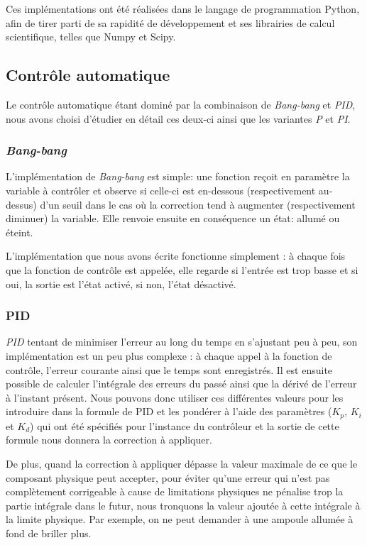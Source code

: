 \documentclass[a4paper,10pt]{report}
\begin{document}
Ces implémentations ont été réalisées dans le langage de programmation Python, afin de tirer parti de sa rapidité de développement et ses librairies de calcul scientifique, telles que Numpy et Scipy.

\subsection{Contrôle automatique}
\label{sec:contr-implem}
Le contrôle automatique étant dominé par la combinaison de \textit{Bang-bang} et \textit{PID}, nous avons choisi d'étudier en détail ces deux-ci ainsi que les variantes \textit{P} et \textit{PI}.

\subsubsection{\emph{Bang-bang}}

L'implémentation de \emph{Bang-bang} est simple: une fonction reçoit en paramètre la variable à contrôler et observe si celle-ci est en-dessous (respectivement au-dessus) d'un seuil dans le cas où la correction tend à augmenter (respectivement diminuer) la variable. Elle renvoie ensuite en conséquence un état: allumé ou éteint.

L'implémentation que nous avons écrite fonctionne simplement : à chaque fois que la fonction de contrôle est appelée, elle regarde si l'entrée est trop basse et si oui, la sortie est l'état activé, si non, l'état désactivé.

\subsubsection{PID}

\emph{PID} tentant de minimiser l'erreur au long du temps en s'ajustant peu à peu, son implémentation est un peu plus complexe : à chaque appel à la fonction de contrôle, l'erreur courante ainsi que le temps sont enregistrés.
Il est ensuite possible de calculer l'intégrale des erreurs du passé ainsi que la dérivé de l'erreur à l'instant présent.
Nous pouvons donc utiliser ces différentes valeurs pour les introduire dans la formule de PID et les pondérer à l'aide des paramètres ($K_p$, $K_i$ et $K_d$) qui ont été spécifiés pour l'instance du contrôleur et la sortie de cette formule nous donnera la correction à appliquer.

De plus, quand la correction à appliquer dépasse la valeur maximale de ce que le composant physique peut accepter, pour éviter qu'une erreur qui n'est pas complètement corrigeable à cause de limitations physiques ne pénalise trop la partie intégrale dans le futur, nous tronquons la valeur ajoutée à cette intégrale à la limite physique. Par exemple, on ne peut demander à une ampoule allumée à fond de briller plus.
\end{document}
